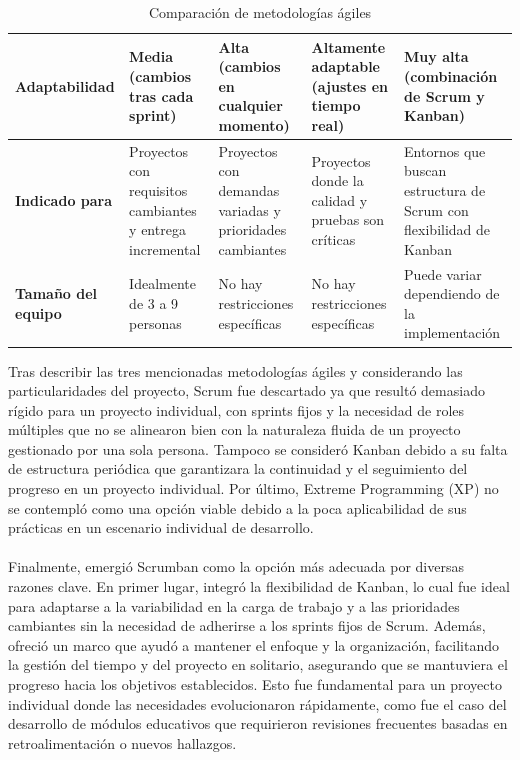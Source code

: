 \begin{table}[H]
\begin{tabular}{| m{2.5cm} | m{2.8cm} | m{2.8cm} | m{2.8cm} | m{2.8cm} |}
        \hline
        \textbf{Adaptabilidad} & Media (cambios tras cada sprint) & Alta (cambios en cualquier momento) & Altamente adaptable (ajustes en tiempo real) & Muy alta (combinación de Scrum y Kanban) \\
        \hline
        \textbf{Indicado para} & Proyectos con requisitos cambiantes y entrega incremental & Proyectos con demandas variadas y prioridades cambiantes & Proyectos donde la calidad y pruebas son críticas & Entornos que buscan estructura de Scrum con flexibilidad de Kanban \\
        \hline
        \textbf{Tamaño del equipo} & Idealmente de 3 a 9 personas & No hay restricciones específicas & No hay restricciones específicas & Puede variar dependiendo de la implementación \\
        \hline
    \end{tabular}
    \caption{Comparación de metodologías ágiles}
    \label{tab:metodologias-agiles}
\end{table}
Tras describir las tres mencionadas metodologías ágiles y considerando las particularidades del proyecto, Scrum fue descartado ya que resultó demasiado rígido para un proyecto individual, con sprints fijos y la necesidad de roles múltiples que no se alinearon bien con la naturaleza fluida de un proyecto gestionado por una sola persona. Tampoco se consideró Kanban debido a su falta de estructura periódica que garantizara la continuidad y el seguimiento del progreso en un proyecto individual. Por último, Extreme Programming (XP) no se contempló como una opción viable debido a la poca aplicabilidad de sus prácticas en un escenario individual de desarrollo.
\\
\\
Finalmente, emergió Scrumban como la opción más adecuada por diversas razones clave. En primer lugar, integró la flexibilidad de Kanban, lo cual fue ideal para adaptarse a la variabilidad en la carga de trabajo y a las prioridades cambiantes sin la necesidad de adherirse a los sprints fijos de Scrum. Además, ofreció un marco que ayudó a mantener el enfoque y la organización, facilitando la gestión del tiempo y del proyecto en solitario, asegurando que se mantuviera el progreso hacia los objetivos establecidos. Esto fue fundamental para un proyecto individual donde las necesidades evolucionaron rápidamente, como fue el caso del desarrollo de módulos educativos que requirieron revisiones frecuentes basadas en retroalimentación o nuevos hallazgos.
